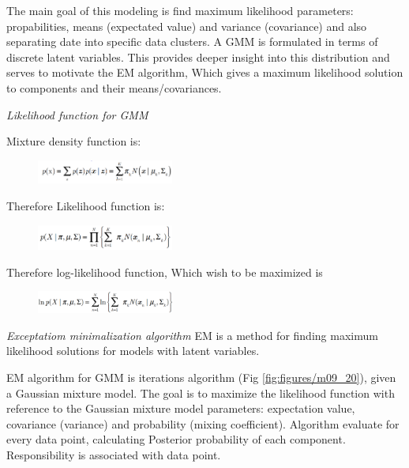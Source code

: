 The main goal of this modeling is find maximum likelihood parameters: propabilities, means (expectated value) and variance (covariance) and also separating date into specific data clusters. A GMM is formulated in terms of discrete latent variables. This provides deeper insight into this distribution and serves to motivate the EM algorithm, Which gives a maximum likelihood solution to components and their means/covariances.

\textit{Likelihood function for GMM}

Mixture density function is: 

\begin{figure}[H]
\centering{}\includegraphics[width=0.4\textwidth]{figures/Module_09/m09_29} 
\end{figure}

Therefore Likelihood function is:

\begin{figure}[H]
\centering{}\includegraphics[width=0.4\textwidth]{figures/Module_09/m09_30}
\end{figure}

Therefore log-likelihood function, Which wish to be maximized is 

\begin{figure}[H]
\centering{}\includegraphics[width=0.4\textwidth]{figures/Module_09/m09_31}
\end{figure}

\textit{Exceptatiom minimalization algorithm}
EM is a method for finding maximum likelihood solutions for models with latent variables.

EM algorithm for GMM is iterations algorithm (Fig \ref{fig:figures/m09_20}), given a Gaussian mixture model. The goal is to maximize the likelihood function with reference to the Gaussian mixture model parameters: expectation value, covariance (variance) and probability (mixing coefficient). Algorithm evaluate for every data point, calculating Posterior probability of each component. Responsibility is associated with data point.

